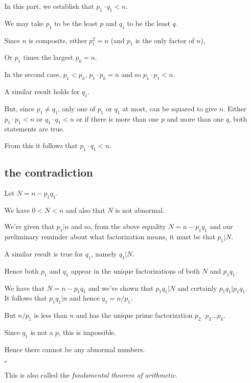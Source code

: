 \documentclass[11pt, oneside]{article}
\begin{document}
In this part, we establish that $p_1 \cdot q_1 < n$.

We may take $p_1$ to be the least $p$ and $q_1$ to be the least $q$.  

Since $n$ is composite, either $p_1^2 = n$ (and $p_1$ is the only factor of $n$),

Or $p_1$ times the largest $p_k = n$.

In the second case, $p_1 < p_k$, $p_1 \cdot p_k = n$ and so $p_1 \cdot p_1 < n$.

A similar result holds for $q_1$.

But, since $p_1 \ne q_1$, only one of $p_1$ or $q_1$ at most, can be squared to give $n$.  Either $p_1 \cdot p_1 < n$ or $q_1 \cdot q_1 < n$ or if there is more than one $p$ and more than one $q$, both statements are true.

From this it follows that $p_1 \cdot q_1 < n$. 

\subsection*{the contradiction} 

Let $N = n - p_1 q_1$.

We have $0 < N < n$ and also that $N$ is not abnormal.

We're given that $p_1 | n$ and so, from the above equality $N = n - p_1 q_1$ and our preliminary reminder about what factorization means, it must be that $p_1 | N$.

A similar result is true for $q_1$, namely $q_1 | N$.  

Hence both $p_1$ and $q_1$ appear in the unique factorizations of both $N$ and $p_1 q_1$.

We have that $N = n - p_1 q_1$ and we've shown that $p_1 q_1 | N$ and certainly $p_1 q_1 | p_1 q_1$.  It follows that $p_1 q_1 | n$ and hence $q_1 = n/p_1$.  

But $n/p_1$ is less than $n$ and has the unique prime factorization $p_2 \cdot p_3 \dots p_k$.

Since $q_1$ is not a $p$, this is impossible.  

Hence there cannot be any abnormal numbers.

$\square$

This is also called the \emph{fundamental theorem of arithmetic}.
\end{document}
